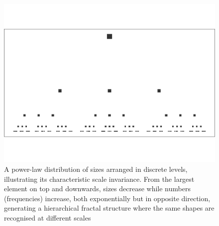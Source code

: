\documentclass[
  12pt,
  a4paper, twoside]{book}
\begin{document}
\begin{figure}

{\centering \includegraphics[width=0.9\linewidth]{bookdown-demo_files/figure-latex/04-hierarchy-1} 

}

\caption[Power-law distributions and hierarchy]{A power-law distribution of sizes arranged in discrete levels, illustrating its characteristic scale invariance. From the largest element on top and downwards, sizes decrease while numbers (frequencies) increase, both exponentially but in opposite direction, generating a hierarchical fractal structure where the same shapes are recognised at different scales}\label{fig:04-hierarchy}
\end{figure}
\end{document}
